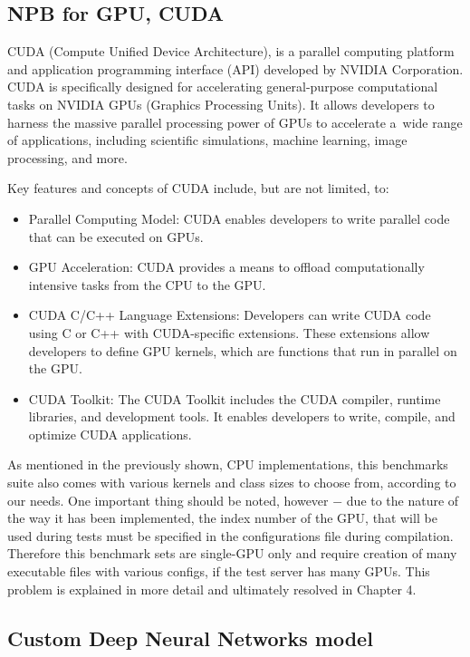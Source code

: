 \subsection{NPB for GPU, CUDA}

CUDA (Compute Unified Device Architecture), is a parallel computing platform
and application programming interface (API) developed by NVIDIA Corporation.
CUDA is specifically designed for accelerating general-purpose computational
tasks on NVIDIA GPUs (Graphics Processing Units). It allows developers to harness
the massive parallel processing power of GPUs to accelerate a~wide range of
applications, including scientific simulations, machine learning, image
processing, and more.

Key features and concepts of CUDA include, but are not limited, to:
\begin{itemize}
    \item Parallel Computing Model: CUDA enables developers to write parallel
    code that can be executed on GPUs.
    \item GPU Acceleration: CUDA provides a means to offload computationally
    intensive tasks from the CPU to the GPU\@.
    \item CUDA C/C++ Language Extensions: Developers can write CUDA code using
    C or C++ with CUDA-specific extensions. These extensions allow developers
    to define GPU kernels, which are functions that run in parallel on the GPU\@.
    \item CUDA Toolkit: The CUDA Toolkit includes the CUDA compiler, runtime
    libraries, and development tools. It enables developers to write, compile,
    and optimize CUDA applications.
\end{itemize}

As mentioned in the previously shown, CPU implementations, this benchmarks
suite also comes with various kernels and class sizes to choose from, according
to our needs. One important thing should be noted, however $-$ due to the
nature of the way it has been implemented, the index number of the GPU, that
will be used during tests must be specified in the configurations file during
compilation. Therefore this benchmark sets are single-GPU only and require
creation of many executable files with various configs, if the test server
has many GPUs. This problem is explained in more detail and ultimately
resolved in Chapter 4.

\subsection{Custom Deep Neural Networks model}

